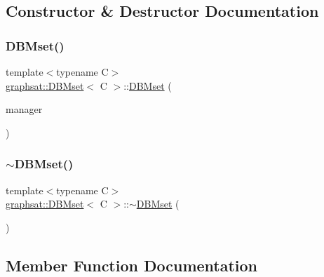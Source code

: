 \subsection{Constructor \& Destructor Documentation}
\mbox{\label{classgraphsat_1_1_d_b_mset_a2a0d8e81172aa1a865cf5819749a80a0}} 
\subsubsection{\texorpdfstring{DBMset()}{DBMset()}}
{\footnotesize\ttfamily template$<$typename C$>$ \\
\mbox{\hyperlink{classgraphsat_1_1_d_b_mset}{graphsat\+::\+D\+B\+Mset}}$<$ C $>$\+::\mbox{\hyperlink{classgraphsat_1_1_d_b_mset}{D\+B\+Mset}} (\begin{DoxyParamCaption}\item[{\mbox{\hyperlink{classgraphsat_1_1_d_b_m_factory}{D\+B\+M\+Factory}}$<$ C $>$ \&}]{manager }\end{DoxyParamCaption})\hspace{0.3cm}{\ttfamily [inline]}}

\mbox{\label{classgraphsat_1_1_d_b_mset_aa0f809f2d7c58227bcde30f6c664c0c1}} 
\subsubsection{\texorpdfstring{$\sim$DBMset()}{~DBMset()}}
{\footnotesize\ttfamily template$<$typename C$>$ \\
\mbox{\hyperlink{classgraphsat_1_1_d_b_mset}{graphsat\+::\+D\+B\+Mset}}$<$ C $>$\+::$\sim$\mbox{\hyperlink{classgraphsat_1_1_d_b_mset}{D\+B\+Mset}} (\begin{DoxyParamCaption}{ }\end{DoxyParamCaption})\hspace{0.3cm}{\ttfamily [inline]}}



\subsection{Member Function Documentation}
\mbox{\label{classgraphsat_1_1_d_b_mset_ad1b2bff46b84f263f58780296410fa0f}} 
